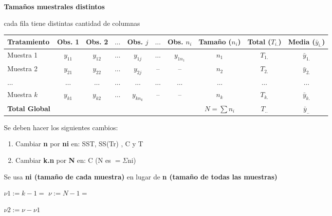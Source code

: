 \documentclass[12pt,a4paper]{article}
\begin{document}
\begin{center}
{\fontsize{16}{20}\selectfont\bfseries Tamaños muestrales distintos}
\end{center}

\begin{center}
cada fila tiene distintas cantidad de columnas
\end{center}

\begin{center}
{\fontsize{12}{14.5}\selectfont
\setlength{\tabcolsep}{5pt}
\begin{tabular}{|l|c c c c c c|c|c|c|}
\hline
\textbf{Tratamiento} & \textbf{Obs. 1} & \textbf{Obs. 2} & $\ldots$ & \textbf{Obs. $j$} & $\ldots$ & \textbf{Obs. $n_i$} & \textbf{Tamaño ($n_i$)} & \textbf{Total ($T_{i.}$)} & \textbf{Media ($\bar{y}_{i.}$)} \\
\hline
Muestra 1 & $y_{11}$ & $y_{12}$ & $\ldots$ & $y_{1j}$ & $\ldots$ & $y_{1n_1}$ & $n_1$ & $T_{1.}$ & $\bar{y}_{1.}$ \\
Muestra 2 & $y_{21}$ & $y_{22}$ & $\ldots$ & $y_{2j}$ & -- & -- & $n_2$ & $T_{2.}$ & $\bar{y}_{2.}$ \\
$\ldots$ & $\ldots$ & $\ldots$ & $\ldots$ & $\ldots$ & $\ldots$ & $\ldots$ & $\ldots$ & $\ldots$ & $\ldots$ \\
Muestra $k$ & $y_{k1}$ & $y_{k2}$ & $\ldots$ & $y_{kn_k}$ & -- & -- & $n_k$ & $T_{k.}$ & $\bar{y}_{k.}$ \\
\hline
\textbf{Total Global} & & & & & & & $N=\sum n_i$ & $T_{..}$ & $\bar{y}_{..}$ \\
\hline
\end{tabular}
}
\end{center}

\begin{center}
\begin{minipage}{0.62\linewidth}
Se deben hacer los siguientes cambios:
\begin{enumerate}[leftmargin=26pt,itemsep=2pt,topsep=2pt,parsep=0pt]
  \item Cambiar \textbf{n} por \textbf{ni} en: SST, SS(Tr) , C y T
  \item Cambiar \textbf{k.n} por \textbf{N} en: C (N es $=\Sigma$ni)
\end{enumerate}
Se usa \textbf{ni (tamaño de cada muestra)} en lugar de \textbf{n (tamaño de todas las muestras)}
\end{minipage}
\end{center}

\begin{center}
$\nu 1 := k-1 = $ \hspace{2.2cm} $\nu := N-1 = $

\vspace{6pt}
$\nu 2 := \nu - \nu 1$
\end{center}
\end{document}
